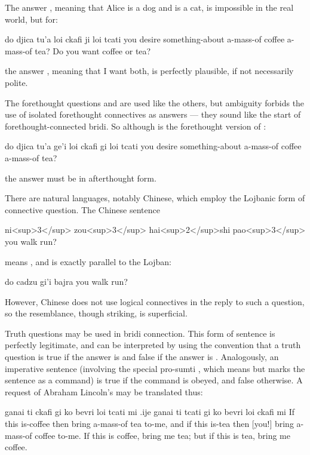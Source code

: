 The answer , meaning that Alice is a dog and is a
    cat, is impossible in the real world, but for:
\begin{example}
do djica tu'a loi ckafi\n
\T	ji loi tcati\n
you desire something-about a-mass-of coffee\n
\T	{} a-mass-of tea?\n
Do you want coffee or tea?
\end{example}

{\noindent}the answer , meaning that I want both, is perfectly
    plausible, if not necessarily polite. 

The forethought questions  and  are used
    like the others, but ambiguity forbids the use of isolated
    forethought connectives as answers --- they sound like the
    start of forethought-connected bridi. So although  is the forethought version of
    :
\begin{example}
do djica tu'a\n
\T	ge'i loi ckafi\n
\T	gi loi tcati\n
you desire something-about\n
\T	{} a-mass-of coffee\n
\T	[or] a-mass-of tea?
\end{example}

{\noindent}the answer must be in afterthought form. 

There are natural languages, notably Chinese, which employ
    the Lojbanic form of connective question. The Chinese
    sentence
\begin{example}
ni<sup>3</sup> zou<sup>3</sup> hai<sup>2</sup>shi pao<sup>3</sup>\n
you walk  run?
\end{example}

{\noindent}means , and is exactly parallel to the
    Lojban:
\begin{example}
do cadzu gi'i bajra\n
you walk  run?
\end{example}

However, Chinese does not use logical connectives in the reply
    to such a question, so the resemblance, though striking, is
    superficial. 

Truth questions may be used in bridi connection. This form
    of sentence is perfectly legitimate, and can be interpreted by
    using the convention that a truth question is true if the
    answer is  and false if the answer is .
    Analogously, an imperative sentence (involving the special
    pro-sumti , which means  but marks the sentence as
    a command) is true if the command is obeyed, and false
    otherwise. A request of Abraham Lincoln's may be translated
    thus:
\begin{example}
ganai ti ckafi\n
\T	gi ko bevri loi tcati mi\n
.ije ganai ti tcati\n
\T	gi ko bevri loi ckafi mi\n
If this is-coffee\n
\T	then  bring a-mass-of tea to-me,\n
and if this is-tea\n
\T	then [you!] bring a-mass-of coffee to-me.\n
If this is coffee, bring me tea;\n
\T	but if this is tea, bring me coffee.
\end{example}

